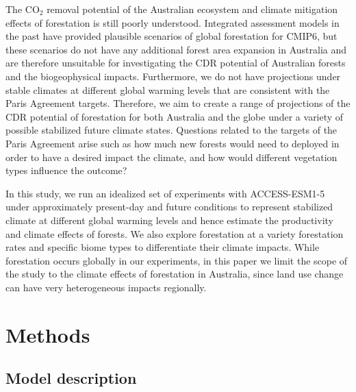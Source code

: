 \documentclass[]{article}
\begin{document}
The CO$_2$ removal potential of the Australian ecosystem and climate mitigation effects of forestation is still poorly understood.
Integrated assessment models in the past have provided plausible scenarios of global forestation for CMIP6, but these scenarios do not have any additional forest area expansion in Australia \parencite{loughran_limited_2023} and are therefore unsuitable for investigating the CDR potential of Australian forests and the biogeophysical impacts.
Furthermore, we do not have projections under stable climates at different global warming levels that are consistent with the Paris Agreement targets.
Therefore, we aim to create a range of projections of the CDR potential of forestation for both Australia and the globe under a variety of possible stabilized future climate states.
Questions related to the targets of the Paris Agreement arise such as how much new forests would need to deployed in order to have a desired impact the climate, and how would different vegetation types influence the outcome?

In this study, we run an idealized set of experiments with ACCESS-ESM1-5 under approximately present-day and future conditions to represent stabilized climate at different global warming levels and hence estimate the productivity and climate effects of forests.
We also explore forestation at a variety forestation rates and specific biome types to differentiate their climate impacts.
While forestation occurs globally in our experiments, in this paper we limit the scope of the study to the climate effects of forestation in Australia, since land use change can have very heterogeneous impacts regionally.

\section{Methods}

\subsection{Model description}
\end{document}
